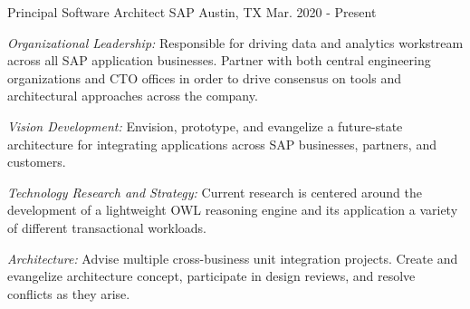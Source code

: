 


\begin{cventries}


\cventry
{Principal Software Architect}
{SAP}
{Austin, TX}
{Mar. 2020 - Present}
{
  \begin{cvitems}
  \item {\emph{Organizational Leadership:} Responsible for driving data and analytics workstream across all SAP application businesses. Partner with both central engineering organizations and CTO offices in order to drive consensus on tools and architectural approaches across the company. }
  \item {\emph{Vision Development:} Envision, prototype, and evangelize a future-state architecture for integrating applications across SAP businesses, partners, and customers.}
  \item {\emph{Technology Research and Strategy:} Current research is centered around the development of a lightweight OWL reasoning engine and its application a variety of different transactional workloads.}
  \item {\emph{Architecture:} Advise multiple cross-business unit integration projects. Create and evangelize architecture concept, participate in design reviews, and resolve conflicts as they arise. }
  \end{cvitems}
}



\end{cventries}
